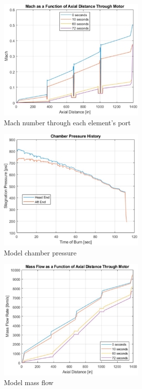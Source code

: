 \begin{figure}
    \centering
    \includegraphics[width=0.65\textwidth]{images/mach-through-motor}
    \caption{Mach number through each element's port}
    \label{figure:mach-through-motor}
\end{figure}

\begin{figure}
    \centering
    \includegraphics[width=0.65\textwidth]{images/combustion-chamber-pressure}
    \caption{Model chamber pressure}
    \label{figure:model-chamber-pressure}
\end{figure}

\begin{figure}
    \centering
    \includegraphics[width=0.65\textwidth]{images/massflow-through-motor}
    \caption{Model mass flow}
    \label{figure:massflow-through-motor}
\end{figure}

